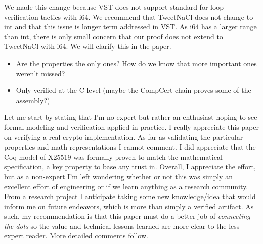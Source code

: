 \begin{answer}
    We made this change because VST does not support standard for-loop
    verification tactics with i64. We recommend that TweetNaCl does not change to
    int and that this issue is longer term addressed in VST. As i64 has a larger
    range than int, there is only small concern that our proof does not extend to
    TweetNaCl with i64. We will clarify this in the paper.
\end{answer}

\begin{itemize}
    \item Are the properties the only ones? How do we know that more important ones weren’t missed?
    \item Only verified at the C level (maybe the CompCert chain proves some of the assembly?)
\end{itemize}


\begin{center}
\end{center}

Let me start by stating that I’m no expert but rather an enthusiast hoping to see formal modeling and verification applied in practice. I really appreciate this paper on verifying a real crypto implementation. As far as validating the particular properties and math representations I cannot comment. I did appreciate that the Coq model of X25519 was formally proven to match the mathematical specification, a key property to base any trust in. Overall, I appreciate the effort, but as a non-expert I’m left wondering whether or not this was simply an excellent effort of engineering or if we learn anything as a research community. From a research project I anticipate taking some new knowledge/idea that would inform me on future endeavors, which is more than simply a verified artifact. As such, my recommendation is that this paper must do a better job of \textit{connecting the dots} so the value and technical lessons learned are more clear to the less expert reader. More detailed comments follow.

